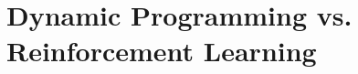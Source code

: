 \section{Dynamic Programming vs. Reinforcement Learning}\label{sec:dynamic-programming-vs.-reinforcement-learning}
%
%
%
%
%
%
%

